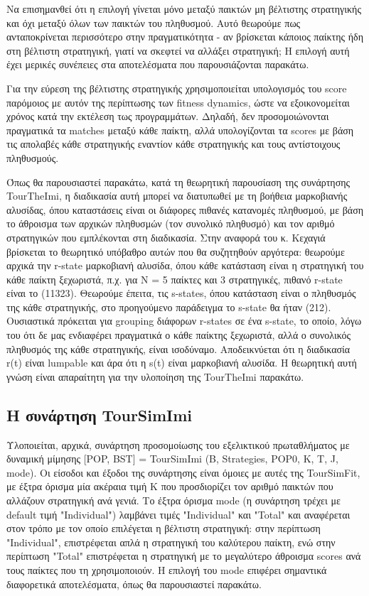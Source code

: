 \documentclass[12pt]{article}
\begin{document}
Να επισημανθεί ότι η επιλογή γίνεται μόνο μεταξύ παικτών μη βέλτιστης στρατηγικής και όχι μεταξύ όλων των παικτών του πληθυσμού. Αυτό θεωρούμε πως ανταποκρίνεται περισσότερο στην πραγματικότητα - αν βρίσκεται κάποιος παίκτης ήδη στη βέλτιστη στρατηγική, γιατί να σκεφτεί να αλλάξει στρατηγική; Η επιλογή αυτή έχει μερικές συνέπειες στα αποτελέσματα που παρουσιάζονται παρακάτω.

Για την εύρεση της βέλτιστης στρατηγικής χρησιμοποιείται υπολογισμός του score παρόμοιος με αυτόν της περίπτωσης των fitness dynamics, ώστε να εξοικονομείται χρόνος κατά την εκτέλεση τως προγραμμάτων. Δηλαδή, δεν προσομοιώνονται πραγματικά τα matches μεταξύ κάθε παίκτη, αλλά υπολογίζονται τα scores με βάση τις απολαβές κάθε στρατηγικής εναντίον κάθε στρατηγικής και τους αντίστοιχους πληθυσμούς.

Όπως θα παρουσιαστεί παρακάτω, κατά τη θεωρητική παρουσίαση της συνάρτησης TourTheImi, η διαδικασία αυτή μπορεί να διατυπωθεί με τη βοήθεια μαρκοβιανής αλυσίδας, όπου καταστάσεις είναι οι διάφορες πιθανές κατανομές πληθυσμού, με βάση το άθροισμα των αρχικών πληθυσμών (τον συνολικό πληθυσμό) και τον αριθμό στρατηγικών που εμπλέκονται στη διαδικασία. Στην αναφορά του κ. Κεχαγιά βρίσκεται το θεωρητικό υπόβαθρο αυτών που θα συζητηθούν αργότερα: θεωρούμε αρχικά την r-state μαρκοβιανή αλυσίδα, όπου κάθε κατάσταση είναι η στρατηγική του κάθε παίκτη ξεχωριστά, π.χ. για N = 5 παίκτες και 3 στρατηγικές, πιθανό r-state είναι το (11323). Θεωρούμε έπειτα, τις s-states, όπου κατάσταση είναι ο πληθυσμός της κάθε στρατηγικής, στο προηγούμενο παράδειγμα το s-state θα ήταν (212). Ουσιαστικά πρόκειται για grouping διάφορων r-states σε ένα s-state, το οποίο, λόγω του ότι δε μας ενδιαφέρει πραγματικά ο κάθε παίκτης ξεχωριστά, αλλά ο συνολικός πληθυσμός της κάθε στρατηγικής, είναι ισοδύναμο. Αποδεικνύεται ότι η διαδικασία r(t) είναι lumpable και άρα ότι η s(t) είναι μαρκοβιανή αλυσίδα. Η θεωρητική αυτή γνώση είναι απαραίτητη για την υλοποίηση της TourTheImi παρακάτω.
\subsection{Η συνάρτηση TourSimImi}
Υλοποιείται, αρχικά, συνάρτηση προσομοίωσης του εξελικτικού πρωταθλήματος με δυναμική μίμησης [POP, BST]\- =\- TourSimImi\- (B,\- Strategies,\- POP0,\- K,\- T, \-J, \- mode). Οι είσοδοι και έξοδοι της συνάρτησης είναι όμοιες με αυτές της TourSimFit, με έξτρα όρισμα μία ακέραια τιμή K που προσδιορίζει τον αριθμό παικτών που αλλάζουν στρατηγική ανά γενιά. Το έξτρα όρισμα mode (η συνάρτηση τρέχει με default τιμή "Individual") λαμβάνει τιμές "Individual" και "Total" και αναφέρεται στον τρόπο με τον οποίο επιλέγεται η βέλτιστη στρατηγική: στην περίπτωση "Individual", επιστρέφεται απλά η στρατηγική του καλύτερου παίκτη, ενώ στην περίπτωση "Total" επιστρέφεται η στρατηγική με το μεγαλύτερο άθροισμα scores ανά τους παίκτες που τη χρησιμοποιούν. Η επιλογή του mode επιφέρει σημαντικά διαφορετικά αποτελέσματα, όπως θα παρουσιαστεί παρακάτω.
\end{document}
